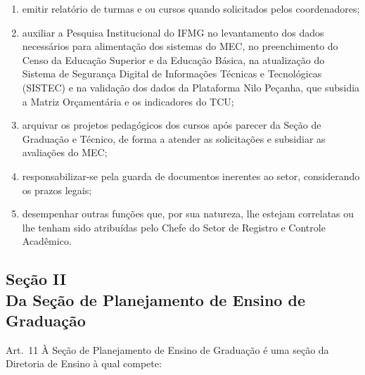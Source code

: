 \documentclass[a4paper,12pt]{report}
\begin{document}
\begin{enumerate}
\item emitir relatório de turmas e ou cursos quando solicitados pelos coordenadores;

\item auxiliar a Pesquisa Institucional do IFMG no levantamento dos dados necessários 
      para alimentação dos sistemas do MEC, no preenchimento do Censo da Educação Superior 
      e da Educação Básica, na atualização do Sistema de Segurança Digital de Informações 
      Técnicas e Tecnológicas (SISTEC) e na validação dos dados da Plataforma Nilo Peçanha, 
      que subsidia a Matriz Orçamentária e os indicadores do TCU;

\item arquivar os projetos pedagógicos dos cursos após parecer da Seção de Graduação e 
      Técnico, de forma a atender as solicitações e subsidiar as avaliações do MEC;

\item responsabilizar-se pela guarda de documentos inerentes ao setor, considerando os 
      prazos legais;

\item desempenhar outras funções que, por sua natureza, lhe estejam correlatas ou lhe 
      tenham sido atribuídas pelo Chefe do Setor de Registro e Controle Acadêmico.

\end{enumerate}


\subsection{Seção II \\ Da Seção de Planejamento de Ensino de Graduação}

Art.~11 À Seção de Planejamento de Ensino de Graduação é uma seção da Diretoria de Ensino 
à qual compete:
\end{document}
